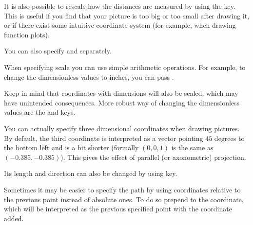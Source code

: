 It is also possible to rescale how the distances are measured by using the
 key. This is useful if you find that your picture is too big or
too small after drawing it, or if there exist some intuitive coordinate system
(for example, when drawing function plots).
\begin{example}
\end{example}
You can also specify  and  separately.

When specifying scale you can use simple arithmetic operations. For example, to
change the dimensionless values to inches, you can pass .
\begin{example}
\end{example}
Keep in mind that coordinates with dimensions will also be scaled, which may
have unintended consequences. More robust way of changing the dimensionless
values are the  and  keys.
\begin{example}
\end{example}

You can actually specify three dimensional coordinates when drawing pictures.
By default, the third coordinate is interpreted as a vector pointing \(45\)
degrees to the bottom left and is a bit shorter (formally \((0, 0, 1)\) is  the
same as \((-0.385, -0.385)\)). This gives the effect of parallel (or
axonometric) projection.
\begin{example}[vertical_mode, examplewidth=0.85\linewidth]
\end{example}
Its length and direction can also be changed by using  key.

Sometimes it may be easier to specify the path by using coordinates relative to
the previous point instead of absolute ones. To do so prepend \ltx{++} to the
coordinate, which will be interpreted as the previous specified point with the
coordinate added.
\begin{example}
\end{example}


